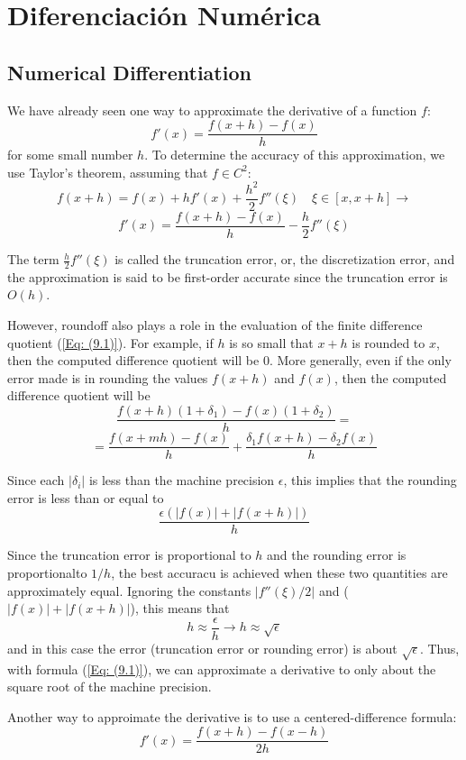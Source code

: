 \chapter{Diferenciación Numérica}
\section{Numerical Differentiation}
We have already seen one way to approximate the derivative of a function $f$:
\begin{equation}
    f'(x) = \frac{f(x + h) - f(x)}{h}
    \label{Eq: (9.1)}
\end{equation}
for some small number $h$. To determine the accuracy of this approximation, we use Taylor's theorem, assuming that $f \in C^2$: 
\[ f(x + h) = f(x) + h f'(x) + \frac{h^2}{2} f''(\xi) \quad \xi \in [x, x+h] \rightarrow \]
\[ f'(x) = \frac{f(x + h) - f(x)}{h} - \frac{h}{2} f''(\xi)\]

The term $\frac{h}{2} f''(\xi)$ is called the truncation error, or, the discretization error, and the approximation is said to be first-order accurate since the truncation error is $O(h)$.

However, roundoff also plays a role in the evaluation of the finite difference quotient (\ref{Eq: (9.1)}). For example, if $h$ is so small that $x + h$ is rounded to $x$, then the computed difference quotient will be 0. More generally, even if the only error made is in rounding the values $f(x + h)$ and $f(x)$, then the computed difference quotient will be
\[ \frac{f(x + h) (1 + \delta_1) - f(x) (1 + \delta_2)}{h} = \]
\[ = \frac{f(x + mh) - f(x)}{h} + \frac{\delta_1 f(x + h) - \delta_2 f(x)}{h}\]

Since each $|\delta_i|$ is less than the machine precision $\epsilon$, this implies that the rounding error is less than or equal to 
\[ \frac{\epsilon(|f(x)| + |f(x + h)|)}{h} \] 

Since the truncation error is proportional to $h$ and the rounding error is proportionalto $1/h$, the best accuracu is achieved when these two quantities are approximately equal. Ignoring the constants $|f''(\xi)/2|$ and ($|f(x)| + |f(x + h)|$), this means that
\[h \approx \frac{\epsilon}{h} \rightarrow h \approx \sqrt{\epsilon}\]
and in this case the error (truncation error or rounding error) is about $\sqrt{\epsilon}$. Thus, with formula (\ref{Eq: (9.1)}), we can approximate a derivative to only about the square root of the machine precision.

Another way to approimate the derivative is to use a centered-difference formula:
\begin{equation}
    f'(x) = \frac{f(x + h) - f(x - h)}{2h}
    \label{Eq: (9.2)}
\end{equation}

